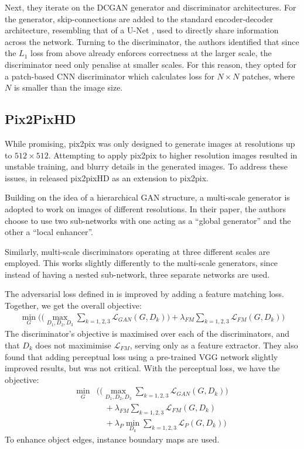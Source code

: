 Next, they iterate on the DCGAN generator and discriminator architectures. For the generator, skip-connections are added to the standard encoder-decoder architecture, resembling that of a U-Net \cite{unet}, used to directly share information across the network.
Turning to the discriminator, the authors identified that since the $L_1$ loss from above already enforces correctness at the larger scale, the discriminator need only penalise at smaller scales.
For this reason, they opted for a patch-based CNN discriminator which calculates loss for $N\times N$ patches, where $N$ is smaller than the image size.

\subsection{Pix2PixHD}

While promising, pix2pix was only designed to generate images at resolutions up to $512\times 512$.
Attempting to apply pix2pix to higher resolution images resulted in unstable training, and blurry details in the generated images.
To address these issues, in \citeyear{pix2pixhd} \citeauthor{pix2pixhd} released pix2pixHD \cite{pix2pixhd} as an extension to pix2pix. 

Building on the idea of a hierarchical GAN structure, a multi-scale generator is adopted to work on images of different resolutions.
In their paper, the authors choose to use two sub-networks with one acting as a ``global generator'' and the other a ``local enhancer''.

Similarly, multi-scale discriminators operating at three different scales are employed.
This works slightly differently to the multi-scale generators, since instead of having a nested sub-network, three separate networks are used.

The adversarial loss defined in  is improved by adding a feature matching loss.
Together, we get the overall objective:
\begin{align} \label{eq:pix2pixhdloss}
    \min_G \Bigg( \bigg( \max_{D_1, D_2, D_3} \sum_{k=1, 2, 3} \mathcal{L}_{GAN} (G, D_k) \bigg) + \lambda_{FM} \sum_{k=1, 2, 3} \mathcal{L}_{FM} (G, D_k) \Bigg)
\end{align}
The discriminator's objective is maximised over each of the discriminators, and that $D_k$ does not maximimise $\mathcal{L}_{FM}$, serving only as a feature extractor. 
They also found that adding perceptual loss using a pre-trained VGG network slightly improved results, but was not critical.
With the perceptual loss, we have the objective:
\begin{equation} \label{eq:pix2pixhdloss2}
\begin{split}
    \min_G & \Bigg(\bigg( \max_{D_1, D_2, D_3} \sum_{k=1, 2, 3} \mathcal{L}_{GAN} (G, D_k) \bigg) \\
           &\quad + \lambda_{FM} \sum_{k=1, 2, 3} \mathcal{L}_{FM} (G, D_k) \\
           &\quad + \lambda_{P} \min_{D_k} \sum_{k=1, 2, 3} \mathcal{L}_{P} (G, D_k) \Bigg)
\end{split}
\end{equation}
To enhance object edges, instance boundary maps are used.

